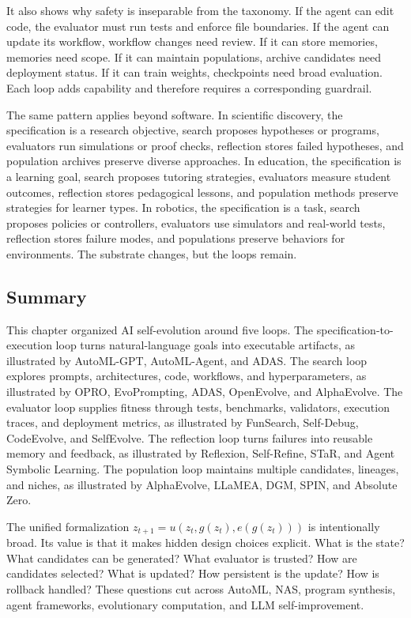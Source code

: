 It also shows why safety is inseparable from the taxonomy.  If the agent can edit code, the evaluator must run tests and enforce file boundaries.  If the agent can update its workflow, workflow changes need review.  If it can store memories, memories need scope.  If it can maintain populations, archive candidates need deployment status.  If it can train weights, checkpoints need broad evaluation.  Each loop adds capability and therefore requires a corresponding guardrail.

The same pattern applies beyond software.  In scientific discovery, the specification is a research objective, search proposes hypotheses or programs, evaluators run simulations or proof checks, reflection stores failed hypotheses, and population archives preserve diverse approaches.  In education, the specification is a learning goal, search proposes tutoring strategies, evaluators measure student outcomes, reflection stores pedagogical lessons, and population methods preserve strategies for learner types.  In robotics, the specification is a task, search proposes policies or controllers, evaluators use simulators and real-world tests, reflection stores failure modes, and populations preserve behaviors for environments.  The substrate changes, but the loops remain.


\subsection{Summary}
\label{subsec:taxonomy-summary}

This chapter organized AI self-evolution around five loops.  The specification-to-execution loop turns natural-language goals into executable artifacts, as illustrated by AutoML-GPT, AutoML-Agent, and ADAS.  The search loop explores prompts, architectures, code, workflows, and hyperparameters, as illustrated by OPRO, EvoPrompting, ADAS, OpenEvolve, and AlphaEvolve.  The evaluator loop supplies fitness through tests, benchmarks, validators, execution traces, and deployment metrics, as illustrated by FunSearch, Self-Debug, CodeEvolve, and SelfEvolve.  The reflection loop turns failures into reusable memory and feedback, as illustrated by Reflexion, Self-Refine, STaR, and Agent Symbolic Learning.  The population loop maintains multiple candidates, lineages, and niches, as illustrated by AlphaEvolve, LLaMEA, DGM, SPIN, and Absolute Zero.

The unified formalization $z_{t+1}=u(z_t,g(z_t),e(g(z_t)))$ is intentionally broad.  Its value is that it makes hidden design choices explicit.  What is the state?  What candidates can be generated?  What evaluator is trusted?  How are candidates selected?  What is updated?  How persistent is the update?  How is rollback handled?  These questions cut across AutoML, NAS, program synthesis, agent frameworks, evolutionary computation, and LLM self-improvement.

